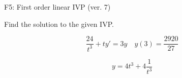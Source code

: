 \begin{exercise}
  \begin{exerciseTitle}F5: First order linear IVP (ver. 7)\end{exerciseTitle}
  \begin{exerciseStatement}
    
Find the solution to the given IVP.

    
\[\frac{24}{t^{3}} +ty'= 3 y \hspace{1em} y( 3 ) = \frac{2920}{27}\]

  \end{exerciseStatement}
  \begin{exerciseAnswer}
    
\[y= 4 t^ 3 +4 \frac{1}{t^{3}}\]

  \end{exerciseAnswer}
\end{exercise}